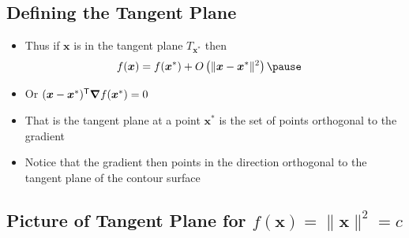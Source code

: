 
\begin{slide}
\section{Defining the Tangent Plane}

\begin{PauseHighLight}
  \begin{itemize}
  \item Thus if $\bm{x}$ is in the tangent plane $T_{\bm{x^*}}$ then
    \begin{align*}
      f(\bm{x}) &= f(\bm{x}^*) + O\bra{\|\bm{x}-\bm{x}^*\|^2}\pause
    \end{align*}
  \item Or $(\bm{x}-\bm{x}^*)^{\textsf{T}} \bm{\nabla} f(\bm{x}^*)=0$\pause
  \item That is the tangent plane at a point $\bm{x}^*$ is the set of
    points orthogonal to the gradient\pause
  \item Notice that the gradient then points in the direction
    orthogonal to the tangent plane of the contour surface\pauseb
  \end{itemize}
\end{PauseHighLight}

\end{slide}


\begin{slide}
\section[-2]{Picture of Tangent Plane for $f(\bm{x})= \|\bm{x}\|^2=c$}

\pause{}
\pb
\begin{center}
  \pause
\end{center}
\end{slide}



